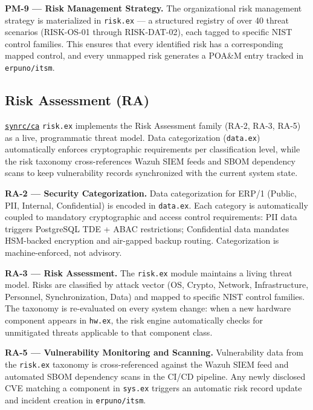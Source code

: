 \documentclass{article}
\begin{document}
\textbf{PM-9 --- Risk Management Strategy.}
The organizational risk management strategy is materialized in \texttt{risk.ex} --- a structured registry of over 40 threat scenarios (RISK-OS-01 through RISK-DAT-02), each tagged to specific NIST control families. This ensures that every identified risk has a corresponding mapped control, and every unmapped risk generates a POA\&M entry tracked in \texttt{erpuno/itsm}.

\subsection{Risk Assessment (RA)}

\href{https://github.com/synrc/ca}{\texttt{synrc/ca}} \texttt{risk.ex} implements the Risk Assessment family (RA-2, RA-3, RA-5) as a live, programmatic threat model. Data categorization (\texttt{data.ex}) automatically enforces cryptographic requirements per classification level, while the risk taxonomy cross-references Wazuh SIEM feeds and SBOM dependency scans to keep vulnerability records synchronized with the current system state.

\textbf{RA-2 --- Security Categorization.}
Data categorization for ERP/1 (Public, PII, Internal, Confidential) is encoded in \texttt{data.ex}. Each category is automatically coupled to mandatory cryptographic and access control requirements: PII data triggers PostgreSQL TDE + ABAC restrictions; Confidential data mandates HSM-backed encryption and air-gapped backup routing. Categorization is machine-enforced, not advisory.

\textbf{RA-3 --- Risk Assessment.}
The \texttt{risk.ex} module maintains a living threat model. Risks are classified by attack vector (OS, Crypto, Network, Infrastructure, Personnel, Synchronization, Data) and mapped to specific NIST control families. The taxonomy is re-evaluated on every system change: when a new hardware component appears in \texttt{hw.ex}, the risk engine automatically checks for unmitigated threats applicable to that component class.

\textbf{RA-5 --- Vulnerability Monitoring and Scanning.}
Vulnerability data from the \texttt{risk.ex} taxonomy is cross-referenced against the Wazuh SIEM feed and automated SBOM dependency scans in the CI/CD pipeline. Any newly disclosed CVE matching a component in \texttt{sys.ex} triggers an automatic risk record update and incident creation in \texttt{erpuno/itsm}.
\end{document}
